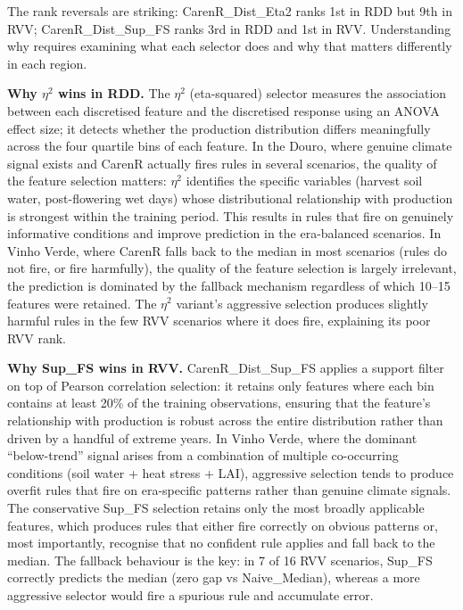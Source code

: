 The rank reversals are striking: CarenR\_Dist\_Eta2 ranks 1st in RDD but 9th in RVV; CarenR\_Dist\_Sup\_FS ranks 3rd in RDD and 1st in RVV. Understanding why requires examining what each selector does and why that matters differently in each region.

\textbf{Why $\eta$$^2$ wins in RDD. }The $\eta$$^2$ (eta-squared) selector measures the association between each discretised feature and the discretised response using an ANOVA effect size; it detects whether the production distribution differs meaningfully across the four quartile bins of each feature. In the Douro, where genuine climate signal exists and CarenR actually fires rules in several scenarios, the quality of the feature selection matters: $\eta$$^2$ identifies the specific variables (harvest soil water, post-flowering wet days) whose distributional relationship with production is strongest within the training period. This results in rules that fire on genuinely informative conditions and improve prediction in the era-balanced scenarios. In Vinho Verde, where CarenR falls back to the median in most scenarios (rules do not fire, or fire harmfully), the quality of the feature selection is largely irrelevant, the prediction is dominated by the fallback mechanism regardless of which 10--15 features were retained. The $\eta$$^2$ variant's aggressive selection produces slightly harmful rules in the few RVV scenarios where it does fire, explaining its poor RVV rank.

\textbf{Why Sup\_FS wins in RVV. }CarenR\_Dist\_Sup\_FS applies a support filter on top of Pearson correlation selection: it retains only features where each bin contains at least 20\% of the training observations, ensuring that the feature's relationship with production is robust across the entire distribution rather than driven by a handful of extreme years. In Vinho Verde, where the dominant ``below-trend'' signal arises from a combination of multiple co-occurring conditions (soil water + heat stress + LAI), aggressive selection tends to produce overfit rules that fire on era-specific patterns rather than genuine climate signals. The conservative Sup\_FS selection retains only the most broadly applicable features, which produces rules that either fire correctly on obvious patterns or, most importantly, recognise that no confident rule applies and fall back to the median. The fallback behaviour is the key: in 7 of 16 RVV scenarios, Sup\_FS correctly predicts the median (zero gap vs Naive\_Median), whereas a more aggressive selector would fire a spurious rule and accumulate error.

